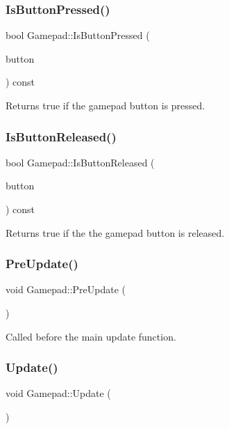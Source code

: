 \subsubsection{\texorpdfstring{Is\+Button\+Pressed()}{IsButtonPressed()}}
{\footnotesize\ttfamily bool Gamepad\+::\+Is\+Button\+Pressed (\begin{DoxyParamCaption}\item[{S\+D\+L\+\_\+\+Game\+Controller\+Button}]{button }\end{DoxyParamCaption}) const}

Returns true if the gamepad button is pressed. \mbox{\label{class_gamepad_a1e0c5e44c5fa4a871eb1dcff1a47a44e}} 
\subsubsection{\texorpdfstring{Is\+Button\+Released()}{IsButtonReleased()}}
{\footnotesize\ttfamily bool Gamepad\+::\+Is\+Button\+Released (\begin{DoxyParamCaption}\item[{S\+D\+L\+\_\+\+Game\+Controller\+Button}]{button }\end{DoxyParamCaption}) const}

Returns true if the the gamepad button is released. \mbox{\label{class_gamepad_aa53820795fc6ae0c38b495f90e730fa7}} 
\subsubsection{\texorpdfstring{Pre\+Update()}{PreUpdate()}}
{\footnotesize\ttfamily void Gamepad\+::\+Pre\+Update (\begin{DoxyParamCaption}{ }\end{DoxyParamCaption})}

Called before the main update function. \mbox{\label{class_gamepad_aade3185158726ef97b588f8c58cb9f8e}} 
\subsubsection{\texorpdfstring{Update()}{Update()}}
{\footnotesize\ttfamily void Gamepad\+::\+Update (\begin{DoxyParamCaption}{ }\end{DoxyParamCaption})}

